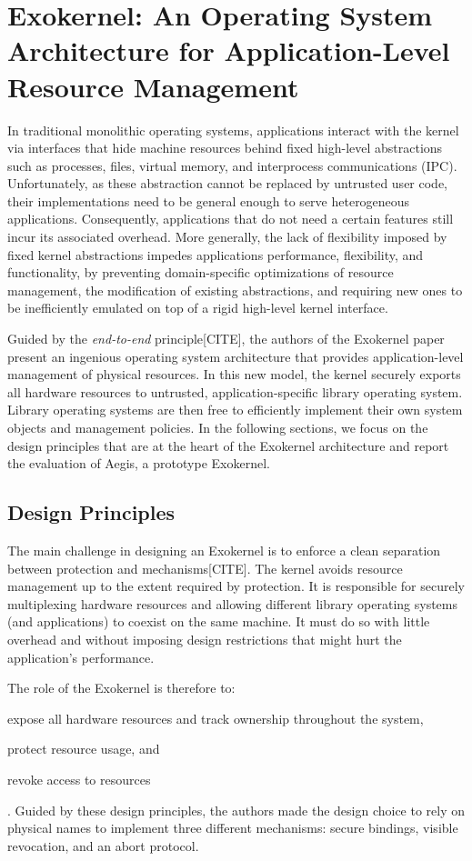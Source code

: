 \section{Exokernel: An Operating System Architecture for Application-Level Resource Management}

In traditional monolithic operating systems, applications interact with the kernel via interfaces that hide machine resources behind fixed high-level abstractions such as processes, files, virtual memory, and interprocess communications (IPC).
Unfortunately, as these abstraction cannot be replaced by untrusted user code, their implementations need to be general enough to serve heterogeneous applications.
Consequently, applications that do not need a certain features still incur its associated overhead.
More generally, the lack of flexibility imposed by fixed kernel abstractions impedes applications performance, flexibility, and functionality, by preventing domain-specific optimizations of resource management, the modification of existing abstractions, and requiring new ones to be inefficiently emulated on top of a rigid high-level kernel interface.

Guided by the \emph{end-to-end} principle[CITE], the authors of the Exokernel paper present an ingenious operating system architecture that provides application-level management of physical resources.
In this new model, the kernel securely exports all hardware resources to untrusted, application-specific library operating system.
Library operating systems are then free to efficiently implement their own system objects and management policies.
In the following sections, we focus on the design principles that are at the heart of the Exokernel architecture and report the evaluation of Aegis, a prototype Exokernel.

\subsection{Design Principles}
The main challenge in designing an Exokernel is to enforce a clean separation between protection and mechanisms[CITE].
The kernel avoids resource management up to the extent required by protection.
It is responsible for securely multiplexing hardware resources and allowing different library operating systems (and applications) to coexist on the same machine.
It must do so with little overhead and without imposing design restrictions that might hurt the application's performance.

The role of the Exokernel is therefore to:
\begin{enumerate*}
	\item \label{expose} expose all hardware resources and track ownership throughout the system,
	\item \label{protect} protect resource usage, and
	\item \label{revoke} revoke access to resources
\end{enumerate*}.
Guided by these design principles, the authors made the design choice to rely on physical names to implement three different mechanisms: secure bindings, visible revocation, and an abort protocol.

